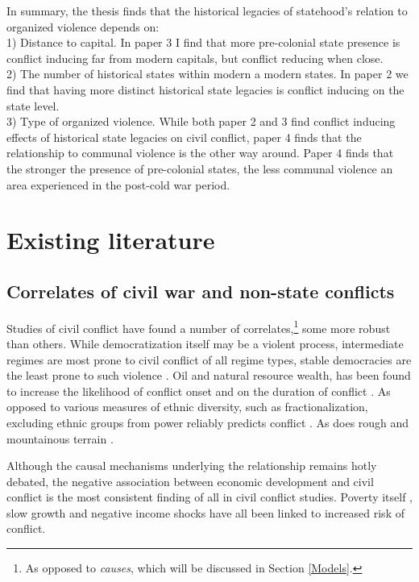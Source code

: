In summary, the thesis finds that the historical legacies of statehood's
relation to organized violence depends on:\\

1) Distance to capital. In paper 3 I find that more pre-colonial state presence
is conflict inducing far from modern capitals, but conflict reducing when
close.\\

2) The number of historical states within modern a modern states. In paper 2 we
find that having more distinct historical state legacies is conflict inducing on
the state level.\\

3) Type of organized violence. While both paper 2 and 3 find conflict inducing
effects of historical state legacies on civil conflict, paper 4 finds that the
relationship to communal violence is the other way around. Paper 4 finds that
the stronger the presence of pre-colonial states, the less communal violence an
area experienced in the post-cold war period.

\section{Existing literature} \label{Existing literature}
\subsection{Correlates of civil war and non-state conflicts} 
\label{Correlates of civil war and non-state conflicts}

Studies of civil conflict have found a number of correlates,\footnote{As opposed
to \textit{causes}, which will be discussed in Section \ref{Models}.} some more robust
than others. While democratization itself may be a violent process, intermediate
regimes are most prone to civil conflict of all regime types, stable democracies
are the least prone to such violence \citep{Hegre2001, Goldstone_2010}. 
Oil and natural resource wealth, has been found to increase the likelihood of
conflict onset and on the duration of conflict \citep{Lujala2010, Lujala2005,
Lujala_2008, Ross_2006}. As opposed to various measures of ethnic diversity,
such as fractionalization, excluding ethnic groups from power reliably predicts
conflict \citep{CedermanLars-Erik2013Igac}. As does rough and mountainous
terrain \citep{Buhaug_2010, Hegre2006}.

Although the causal mechanisms underlying the relationship remains hotly debated,
the negative association between economic development and civil conflict is the
most consistent finding of all in civil conflict studies. Poverty itself
\citep{Hegre2006}, slow growth \citep{Hegre2006} and negative income shocks have
all been linked to increased risk of conflict.

